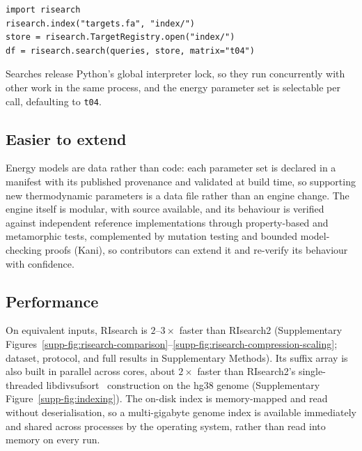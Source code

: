 \begin{verbatim}
import risearch
risearch.index("targets.fa", "index/")
store = risearch.TargetRegistry.open("index/")
df = risearch.search(queries, store, matrix="t04")
\end{verbatim}

Searches release Python's global interpreter lock, so they run concurrently with other work in the same process, and the energy parameter set is selectable per call, defaulting to \texttt{t04}.

\subsection*{Easier to extend}

Energy models are data rather than code: each parameter set is declared in a manifest with its published provenance and validated at build time, so supporting new thermodynamic parameters is a data file rather than an engine change.
The engine itself is modular, with source available, and its behaviour is verified against independent reference implementations through property-based and metamorphic tests, complemented by mutation testing and bounded model-checking proofs (Kani), so contributors can extend it and re-verify its behaviour with confidence.

\subsection*{Performance}

On equivalent inputs, RIsearch is $2$--$3\times$ faster than RIsearch2 (Supplementary Figures~\ref*{supp-fig:risearch-comparison}--\ref*{supp-fig:risearch-compression-scaling}; dataset, protocol, and full results in Supplementary Methods).
Its suffix array is also built in parallel across cores, about $2\times$ faster than RIsearch2's single-threaded libdivsufsort~\citep{libdivsufsort} construction on the hg38 genome (Supplementary Figure~\ref*{supp-fig:indexing}).
The on-disk index is memory-mapped and read without deserialisation, so a multi-gigabyte genome index is available immediately and shared across processes by the operating system, rather than read into memory on every run.

